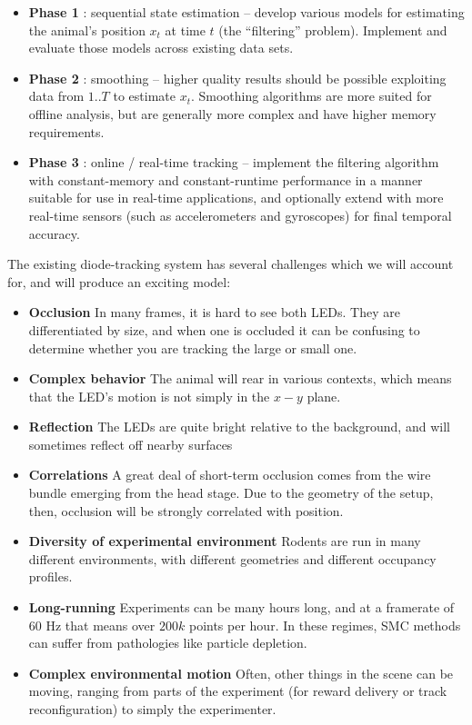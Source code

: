 \documentclass{article}
\begin{document}
\begin{itemize}
\item \textbf{Phase 1} : sequential state estimation -- develop various
  models for estimating the animal's position $x_t$ at time $t$ (the
  ``filtering'' problem). Implement and evaluate those models across
  existing data sets.
\item \textbf{Phase 2} : smoothing -- higher quality results should be
  possible exploiting data from $1..T$ to estimate $x_t$. Smoothing
  algorithms are more suited for offline analysis, but are generally
  more complex and have higher memory requirements.
\item \textbf{Phase 3} : online / real-time tracking -- implement the
  filtering algorithm with constant-memory and constant-runtime
  performance in a manner suitable for use in real-time applications,
  and optionally extend with more real-time sensors (such as
  accelerometers and gyroscopes) for final temporal accuracy.
\end{itemize}

The existing diode-tracking system has several challenges which we
will account for, and will produce an exciting model:

\begin{itemize}
\item \textbf{Occlusion} In many frames, it is hard to see both LEDs. They are
  differentiated by size, and when one is occluded it can be confusing
  to determine whether you are tracking the large or small one.
\item \textbf{Complex behavior} The animal will rear in various contexts,
  which means that the LED's motion is not simply in the $x-y$ plane.
\item \textbf{Reflection} The LEDs are quite bright relative to the
  background, and will sometimes reflect off nearby surfaces
\item \textbf{Correlations} A great deal of short-term occlusion comes from
  the wire bundle emerging from the head stage. Due to the geometry of
  the setup, then, occlusion will be strongly correlated with
  position.
\item \textbf{Diversity of experimental environment} Rodents are run in many
  different environments, with different geometries and different
  occupancy profiles.
\item \textbf{Long-running} Experiments can be many hours long, and at a
  framerate of 60 Hz that means over $200k$ points per hour. In
  these regimes, SMC methods can suffer from pathologies like particle
  depletion.
\item \textbf{Complex environmental motion} Often, other things in the scene
  can be moving, ranging from parts of the experiment (for reward
  delivery or track reconfiguration) to simply the experimenter.
\end{itemize}
\end{document}
